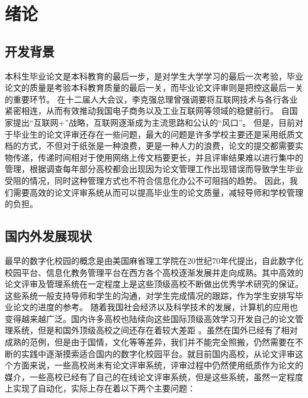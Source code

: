 
\chapter{绪论}
\label{chap02}
\section{开发背景}

本科生毕业论文是本科教育的最后一步，是对学生大学学习的最后一次考验，毕业论文的质量是考验本科教育质量的最后一关\cite{.2019}，而毕业论文评审则是把控这最后一关的重要环节。
在十二届人大会议，李克强总理曾强调要将互联网技术与各行各业紧密相连，从而有效推动我国电子商务以及工业互联网等领域的稳健前行\cite{.2020c}。
自国家提出“互联网+”战略，互联网逐渐成为主流思路和公认的“风口”\cite{.20183}。
但是，目前对于毕业生的论文评审还存在一些问题，最大的问题是许多学校主要还是采用纸质文档的方式，不但对于纸张是一种浪费，更是一种人力的浪费，论文的提交都需要实物传递，传递时间相对于使用网络上传文档要更长，并且评审结果难以进行集中的管理\cite{.2017e}，根据调查每年部分高校都会出现因为论文管理工作出现错误而导致学生毕业受阻的情况\cite{.2018}，同时这种管理方式也不符合信息化办公不可阻挡的趋势。
因此，我们需要高效的论文评审系统从而可以提高毕业生的论文质量，减轻导师和学校管理的负担\cite{.2019d}。

\section{国内外发展现状}

最早的数字化校园的概念是由美国麻省理工学院在20世纪70年代提出\cite{张磊2020数字校园下高职院校教务管理系统设计}，自此数字化校园平台、信息化教务管理平台在西方各个高校逐渐发展并走向成熟。其中高效的论文评审及管理系统在一定程度上是这些顶级高校不断做出优秀学术研究的保证。这些系统一般支持导师和学生的沟通，对学生完成情况的跟踪，作为学生安排写毕业论文的进度的参考。
随着我国社会经济以及科学技术的发展，计算机的应用也变得越来越广泛\cite{.2020h}。国内许多高校也陆续向这些国际顶级高效学习开发自己的论文管理系统，但是和国外顶级高校之间还存在着较大差距 \cite{.2017e}。虽然在国外已经有了相对成熟的范例，但是由于国情，文化等等差异，我们并不能完全照搬，仍然需要在不断的实践中逐渐摸索适合国内的数字化校园平台。就目前国内高校，从论文评审这个方面来说，一些高校尚未有论文评审系统，评审过程中仍然使用纸质作为论文的媒介，一些高校已经有了自己的在线论文评审系统，但是这些系统，虽然一定程度上实现了自动化，实际上存在着以下两个主要问题：

